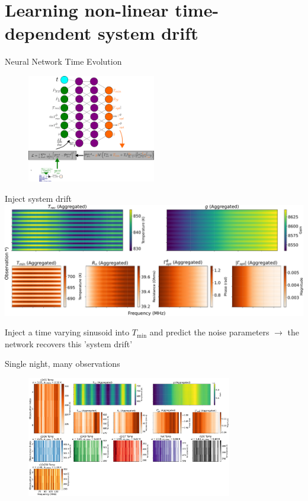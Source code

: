 \documentclass[aspectratio=169]{beamer}
\begin{document}
\section{Learning non-linear time-dependent system drift}

\begin{frame}{\small{Neural Network Time Evolution}}
	\begin{figure}
		\centering
		\includegraphics[width=0.5\textwidth]{images/nn_time.pdf}
	\end{figure}
\end{frame}

\begin{frame}{\small{Inject system drift}}
	\centering
	\includegraphics[width=\textwidth]{images/temps_combined_2d.pdf}
	\begin{tcolorbox}[colback=blue!5!white,colframe=blue!75!black,title=]
		Inject a time varying sinusoid into $T_{\text{min}}$ and predict the noise parameters $\rightarrow$ the network recovers this 'system drift'
	\end{tcolorbox}
\end{frame}

\begin{frame}{\small{Single night, many observations}}
	\begin{figure}
		\centering
		\includegraphics[width=0.8\textwidth]{images/pasted_image_20250403112230.png}
	\end{figure}
\end{frame}
\end{document}
